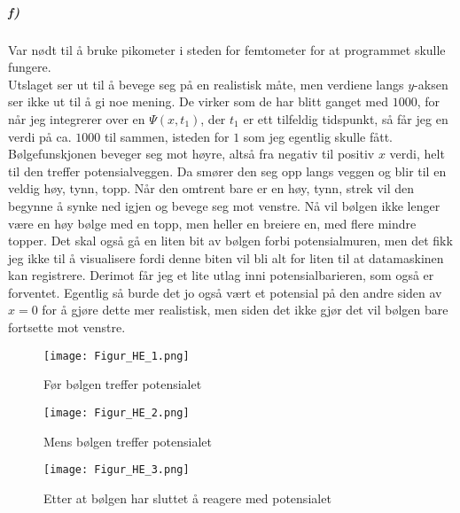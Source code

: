 \documentclass[11pt, A4paper,norsk]{article}
\begin{document}
			\subparagraph{f)}
				\begin{flushleft}
Var nødt til å bruke pikometer i steden for femtometer for at programmet skulle fungere. \\
Utslaget ser ut til å bevege seg på en realistisk måte, men verdiene langs $y$-aksen ser ikke ut til å gi noe mening. De virker som de har blitt ganget med $1000$, for når jeg integrerer over en $\Psi(x, t_1)$, der $t_1$ er ett tilfeldig tidspunkt, så får jeg en verdi på ca. $1000$ til sammen, isteden for $1$ som jeg egentlig skulle fått. \\
Bølgefunskjonen beveger seg mot høyre, altså fra negativ til positiv $x$ verdi, helt til den treffer potensialveggen. Da smører den seg opp langs veggen og blir til en veldig høy, tynn, topp. Når den omtrent bare er en høy, tynn, strek vil den begynne å synke ned igjen og bevege seg mot venstre. Nå vil bølgen ikke lenger være en høy bølge med en topp, men heller en breiere en, med flere mindre topper. Det skal også gå en liten bit av bølgen forbi potensialmuren, men det fikk jeg ikke til å visualisere fordi denne biten vil bli alt for liten til at datamaskinen kan registrere. Derimot får jeg et lite utlag inni potensialbarieren, som også er forventet.
Egentlig så burde det jo også vært et potensial på den andre siden av $x = 0$ for å gjøre dette mer realistisk, men siden det ikke gjør det vil bølgen bare fortsette mot venstre.
				\end{flushleft}

				\begin{figure}[H]
\texttt{[image: Figur\_HE\_1.png]} \\
\caption{Før bølgen treffer potensialet}
				\end{figure}
				\begin{figure}[H]
\texttt{[image: Figur\_HE\_2.png]} \\
\caption{Mens bølgen treffer potensialet}
				\end{figure}
				\begin{figure}[H]
\texttt{[image: Figur\_HE\_3.png]} \\
\caption{Etter at bølgen har sluttet å reagere med potensialet}
				\end{figure}
\end{document}
